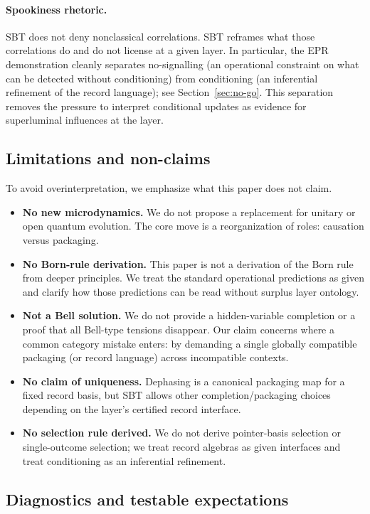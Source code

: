 \paragraph{Spookiness rhetoric.}
SBT does not deny nonclassical correlations.
SBT reframes what those correlations do and do not license at a given layer.
In particular, the EPR demonstration cleanly separates no-signalling (an operational constraint on what can be detected without conditioning) from conditioning (an inferential refinement of the record language); see Section~\ref{sec:no-go}.
This separation removes the pressure to interpret conditional updates as evidence for superluminal influences at the layer.

\subsection{Limitations and non-claims}

To avoid overinterpretation, we emphasize what this paper does not claim.

\begin{itemize}
  \item \textbf{No new microdynamics.} We do not propose a replacement for unitary or open quantum evolution. The core move is a reorganization of roles: causation versus packaging.
  \item \textbf{No Born-rule derivation.} This paper is not a derivation of the Born rule from deeper principles. We treat the standard operational predictions as given and clarify how those predictions can be read without surplus layer ontology.
  \item \textbf{Not a Bell solution.} We do not provide a hidden-variable completion or a proof that all Bell-type tensions disappear. Our claim concerns where a common category mistake enters: by demanding a single globally compatible packaging (or record language) across incompatible contexts.
  \item \textbf{No claim of uniqueness.} Dephasing is a canonical packaging map for a fixed record basis, but SBT allows other completion/packaging choices depending on the layer's certified record interface.
  \item \textbf{No selection rule derived.} We do not derive pointer-basis selection or single-outcome selection; we treat record algebras as given interfaces and treat conditioning as an inferential refinement.
\end{itemize}

\subsection{Diagnostics and testable expectations}

